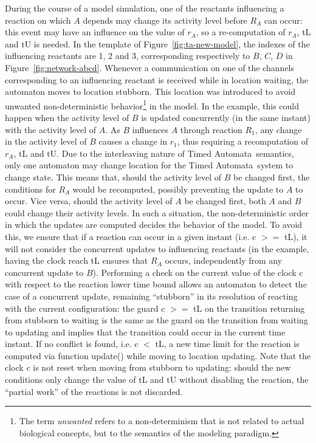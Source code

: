 \documentclass{bmcart}
\def\tas{Timed Automata}
\begin{document}
During the course of a model simulation, one of the reactants influencing a reaction on which $A$ depends may change its activity level
before $R_A$ can occur: this event may have an influence on the value of $r_A$, so a re-computation
of $r_A$, {\sf tL} and {\sf tU} is needed.
In the template of Figure~\ref{fig:ta-new-model}, the indexes of the influencing reactants are 1, 2 and 3,
corresponding respectively to $B$, $C$, $D$ in Figure~\ref{fig:network-abcd}.
Whenever a communication on one of the channels corresponding to an influencing
reactant is received while in location {\sf waiting}, the automaton moves to location
{\sf stubborn}. This location was introduced to avoid unwanted non-deterministic behavior\footnote{The term \emph{unwanted}
refers to a non-determinism that is not related to actual biological concepts, but to the semantics of the modeling
paradigm.} in the model.
In the example, this could happen when the activity level of $B$ is updated concurrently (in the same instant) with the activity level of $A$.
As $B$ influences $A$ through reaction $R_1$, any change in the activity level of $B$ causes a change in $r_1$, thus
requiring a recomputation of $r_A$, {\sf tL} and {\sf tU}. Due to the interleaving nature of \tas\ semantics, only one automaton
may change location for the \tas\ system to change state. This means that, should the activity level of $B$ be changed
first, the conditions for $R_A$ would be recomputed, possibly preventing the update to $A$ to occur. Vice versa, should the activity
level of $A$ be changed first, both $A$ and $B$ could change their activity levels.
In such a situation, the non-deterministic order in which the updates are computed decides the behavior of the model.
To avoid this, we ensure that if a reaction can occur in a given instant (i.e. {\sf c $>=$ tL}), it will not
consider the concurrent updates to influencing reactants (in the example, having the clock reach {\sf tL} ensures that $R_A$ occurs,
independently from any concurrent update to $B$).
Performing a check on the current value of the clock {\sf c} with respect to the reaction lower time bound allows
an automaton to detect the case of a concurrent update, remaining ``stubborn'' in its resolution
of reacting with the current configuration: the guard {\sf c $>=$ tL} on
the transition returning from {\sf stubborn} to {\sf waiting}
is the same as the guard on the transition from {\sf waiting} to {\sf updating} and
implies that the transition could occur in the current time instant.
If no conflict is found, i.e. {\sf c $<$ tL}, a new time limit for the reaction is
computed via function {\sf update()} while moving to location {\sf updating}. Note that the clock {\sf c} is not reset
when moving from {\sf stubborn} to {\sf updating}: should the new conditions only change the value of {\sf tL} and {\sf tU}
without disabling the reaction, the ``partial work'' of the reactions is not discarded.
\end{document}
